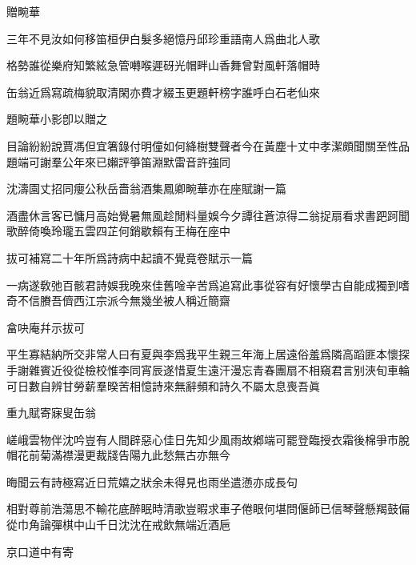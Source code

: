 \documentclass{zhvt-classic-Miya}
\begin{document}
\begin{fw}贈畹華\end{fw}

三年不見汝如何移笛桓伊白髮多絕憶丹邱珍重語南人爲曲北人歌

格勢誰從樂府知繁絃急管囀喉遲砑光帽畔山香舞曾對風軒落帽時

缶翁近爲寫疏梅貌取清閑亦費才綴玉更題軒榜字誰呼白石老仙來

\begin{fw}題畹華小影卽以贈之\end{fw}

目論紛紛說賈馮但宜箸錄付明僮如何絳樹雙聲者今在黃塵十丈中孝潔頗聞關至性品題端可謝羣公年來已嬾評箏笛淵默雷音許強同

\begin{fw}沈濤園丈招同癭公秋岳嗇翁酒集鳳卿畹華亦在座賦謝一篇\end{fw}

酒盡休言客已慵月高始覺暑無風趁閒料量娛今夕譚往蒼涼得二翁捉扇看求書跁跒聞歌醉倚喚玲瓏五雲四芷何銷歇賴有王梅在座中

\begin{fw}拔可補寫二十年所爲詩病中起讀不覺竟卷賦示一篇\end{fw}

一病遂敎弛百骸君詩娛我晚來佳舊唫辛苦爲追寫此事從容有好懷學古自能成獨到嗜奇不信賸吾儕西江宗派今無幾坐被人稱近簡齋

\begin{fw}畣吷庵幷示拔可\end{fw}

平生寡結納所交非常人曰有夏與李爲我平生親三年海上居遠俗羞爲隣高蹈匪本懷探手謝雜賓近役從檢校惟李同宵辰遂惜夏生遠汗漫忘青春團扇不相窺君言别浹旬車輪可日數自辨甘勞薪羣暌苦相憶詩來無辭頻和詩久不屬太息喪吾眞

\begin{fw}重九賦寄寐叟缶翁\end{fw}

嵯峨雲物伴沈吟豈有人間辟惡心佳日先知少風雨故鄕端可罷登臨授衣霜後棉爭市脫帽花前菊滿襟漫更裁牋告陽九此愁無古亦無今

\begin{fw}晦聞云有詩極寫近日荒嬉之狀余未得見也雨坐遣懣亦成長句\end{fw}

相對尊前浩蕩思不輸花底醉眠時清歌豈暇求車子倦眼何堪問偃師已信琴聲懸羯鼓偏從巾角論彈棋中山千日沈沈在戒飲無端近酒巵

\begin{fw}京口道中有寄\end{fw}
\end{document}
